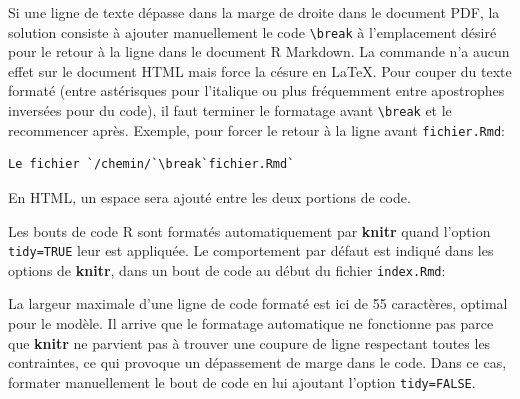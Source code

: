 \documentclass[
  12pt,
  french,
  a4paper,
  extrafontsizes,onecolumn,openright
  ]{memoir}
\newenvironment{Shaded}{\begin{snugshade}}{\end{snugshade}}
\newcommand{\CommentTok}[1]{\textcolor[rgb]{0.56,0.35,0.01}{\textit{#1}}}
\newcommand{\DataTypeTok}[1]{\textcolor[rgb]{0.13,0.29,0.53}{#1}}
\newcommand{\DecValTok}[1]{\textcolor[rgb]{0.00,0.00,0.81}{#1}}
\newcommand{\KeywordTok}[1]{\textcolor[rgb]{0.13,0.29,0.53}{\textbf{#1}}}
\newcommand{\NormalTok}[1]{#1}
\newcommand{\OperatorTok}[1]{\textcolor[rgb]{0.81,0.36,0.00}{\textbf{#1}}}
\newcommand{\OtherTok}[1]{\textcolor[rgb]{0.56,0.35,0.01}{#1}}
\newcommand{\StringTok}[1]{\textcolor[rgb]{0.31,0.60,0.02}{#1}}
\begin{document}
Si une ligne de texte dépasse dans la marge de droite dans le document PDF, la solution consiste à ajouter manuellement le code \texttt{\textbackslash{}break} à l'emplacement désiré pour le retour à la ligne dans le document R Markdown.
La commande n'a aucun effet sur le document HTML mais force la césure en LaTeX.
Pour couper du texte formaté (entre astérisques pour l'italique ou plus fréquemment entre apostrophes inversées pour du code), il faut terminer le formatage avant \texttt{\textbackslash{}break} et le recommencer après.
Exemple, pour forcer le retour à la ligne avant \texttt{fichier.Rmd}:

\begin{verbatim}
Le fichier `/chemin/`\break`fichier.Rmd`
\end{verbatim}

En HTML, un espace sera ajouté entre les deux portions de code.

Les bouts de code R sont formatés automatiquement par \textbf{knitr} quand l'option \texttt{tidy=TRUE} leur est appliquée.
Le comportement par défaut est indiqué dans les options de \textbf{knitr}, dans un bout de code au début du fichier \texttt{index.Rmd}:

\scriptsize

\begin{Shaded}
\end{Shaded}

\normalsize

La largeur maximale d'une ligne de code formaté est ici de 55 caractères, optimal pour le modèle.
Il arrive que le formatage automatique ne fonctionne pas parce que \textbf{knitr} ne parvient pas à trouver une coupure de ligne respectant toutes les contraintes, ce qui provoque un dépassement de marge dans le code.
Dans ce cas, formater manuellement le bout de code en lui ajoutant l'option \texttt{tidy=FALSE}.
\end{document}

